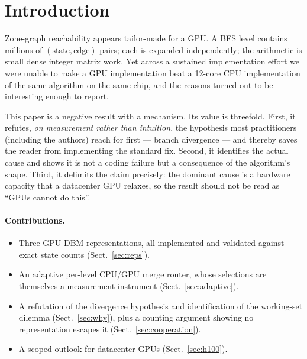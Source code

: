 \section{Introduction}
\label{sec:intro}

Zone-graph reachability appears tailor-made for a GPU. A BFS level contains millions of
$(\text{state},\text{edge})$ pairs; each is expanded independently; the arithmetic is small
dense integer matrix work. Yet across a sustained implementation effort we were unable to
make a GPU implementation beat a 12-core CPU implementation of the same algorithm on the same
chip, and the reasons turned out to be interesting enough to report.

This paper is a negative result with a mechanism. Its value is threefold. First, it refutes,
\emph{on measurement rather than intuition}, the hypothesis most practitioners (including the
authors) reach for first --- branch divergence --- and thereby saves the reader from
implementing the standard fix. Second, it identifies the actual cause and shows it is not a
coding failure but a consequence of the algorithm's shape. Third, it delimits the claim
precisely: the dominant cause is a hardware capacity that a datacenter GPU relaxes, so the
result should not be read as ``GPUs cannot do this''.

\paragraph{Contributions.}
\begin{itemize}
\item Three GPU DBM representations, all implemented and validated against exact
\uppaal{} state counts (Sect.~\ref{sec:reps}).
\item An adaptive per-level CPU/GPU merge router, whose selections are themselves a
measurement instrument (Sect.~\ref{sec:adaptive}).
\item A refutation of the divergence hypothesis and identification of the working-set
dilemma (Sect.~\ref{sec:why}), plus a counting argument showing no representation escapes it
(Sect.~\ref{sec:cooperation}).
\item A scoped outlook for datacenter GPUs (Sect.~\ref{sec:h100}).
\end{itemize}
